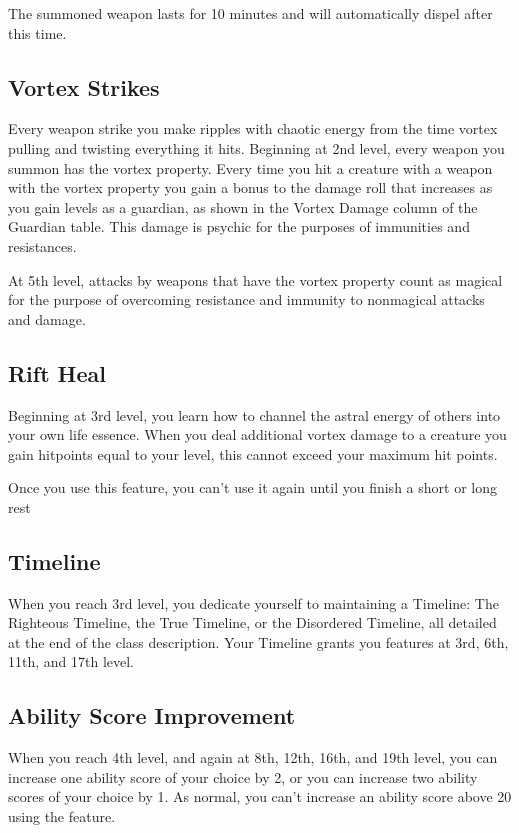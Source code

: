 The summoned weapon lasts for 10 minutes and will automatically dispel after this time.

\subsection{Vortex Strikes}

Every weapon strike you make ripples with chaotic energy from the time vortex pulling and twisting everything it hits. Beginning at 2nd level, every weapon you summon has the vortex property. Every time you hit a creature with a weapon with the vortex property you gain a bonus to the damage roll that increases as you gain levels as a guardian, as shown in the Vortex Damage column of the Guardian table. This damage is psychic for the purposes of immunities and resistances.

At 5th level, attacks by weapons that have the vortex property count as magical for the purpose of overcoming resistance and immunity to nonmagical attacks and damage.

\subsection{Rift Heal}

Beginning at 3rd level, you learn how to channel the astral energy of others into your own life essence. When you deal additional vortex damage to a creature you gain hitpoints equal to your level, this cannot exceed your maximum hit points.

Once you use this feature, you can't use it again until you finish a short or long rest

\subsection{Timeline}

When you reach 3rd level, you dedicate yourself to maintaining a Timeline: The Righteous Timeline, the True Timeline, or the Disordered Timeline, all detailed at the end of the class description. Your Timeline grants you features at 3rd, 6th, 11th, and 17th level.

\subsection{Ability Score Improvement}

When you reach 4th level, and again at 8th, 12th, 16th, and 19th level, you can increase one ability score of your choice by 2, or you can increase two ability scores of your choice by 1. As normal, you can't increase an ability score above 20 using the feature.

